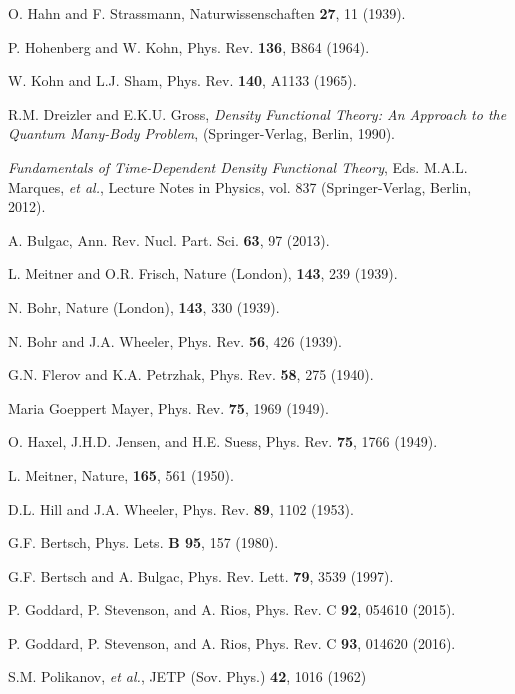 \documentclass{webofc}
\begin{document}
\begin{thebibliography}{99}

 O. Hahn and F. Strassmann, Naturwissenschaften {\bf 27}, 11 (1939).

 P. Hohenberg and W. Kohn,   Phys. Rev. {\bf 136}, B864 (1964).

 W. Kohn and L.J. Sham, Phys. Rev. {\bf 140}, A1133 (1965).

 R.M. Dreizler and E.K.U. Gross, \emph{Density Functional Theory:
An Approach to the Quantum Many-Body Problem}, (Springer-Verlag, Berlin, 1990).

 \emph{ Fundamentals of Time-Dependent Density Functional Theory},
Eds.  M.A.L. Marques, {\it et al.}, Lecture Notes in Physics, vol. 837 (Springer-Verlag, Berlin, 2012).

  A. Bulgac,  Ann. Rev. Nucl. Part. Sci. {\bf 63}, 97 (2013).

 L. Meitner and O.R. Frisch,   Nature (London), {\bf 143}, 239 (1939).

 N. Bohr, Nature (London), {\bf 143}, 330 (1939).

 N. Bohr and J.A. Wheeler,  Phys. Rev. {\bf 56}, 426 (1939).

 G.N. Flerov and K.A. Petrzhak, Phys. Rev. {\bf 58}, 275 (1940).

 Maria Goeppert Mayer,   Phys. Rev. {\bf 75}, 1969 (1949).

 O. Haxel, J.H.D. Jensen, and H.E. Suess,  Phys. Rev. {\bf 75}, 1766 (1949).

 L. Meitner, Nature, {\bf 165}, 561 (1950).

 D.L. Hill and J.A. Wheeler,   Phys. Rev. {\bf 89}, 1102 (1953).

 G.F. Bertsch,  Phys. Lets. {\bf B 95}, 157 (1980).

 G.F. Bertsch and A. Bulgac,   Phys. Rev. Lett. {\bf 79}, 3539 (1997).

 P. Goddard, P. Stevenson, and A. Rios, Phys. Rev. C {\bf 92}, 054610 (2015).

 P. Goddard, P. Stevenson, and A. Rios, Phys. Rev. C {\bf 93}, 014620 (2016).

 S.M. Polikanov, {\it et al.},  JETP (Sov. Phys.) {\bf 42}, 1016 (1962)


\end{thebibliography}
\end{document}
